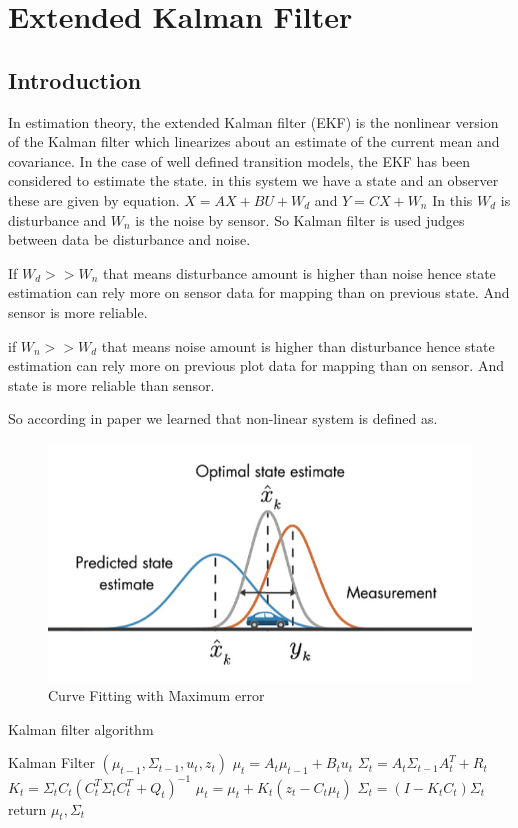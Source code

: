\section{Extended Kalman Filter}
\label{Spline_1}

\subsection{Introduction}
In estimation theory, the extended Kalman filter (EKF) is the nonlinear version of the Kalman filter which linearizes about an estimate of the current mean and covariance. In the case of well defined transition models, the EKF has been considered to estimate the state. 
in this system we have a state and an observer these are given by equation.
$ X=AX +BU + W_d $  and $ Y=CX + W_n $
In this $ W_d $ is disturbance and $ W_n $ is the noise by sensor.
So Kalman filter is used judges between data be disturbance and noise.


If $W_d >> W_n$ that means disturbance amount is higher than noise hence state estimation can rely more on sensor data for mapping than on previous state. And sensor is more reliable.

if $W_n >> W_d$ that means noise amount is higher than disturbance hence state estimation can rely more on previous plot data for mapping than on sensor. And state is more reliable than sensor.

So according in paper we learned that non-linear system is defined as.

\begin{figure}[!htb]
\includegraphics[width=\textwidth]{./figures/EKF.jpg}
\caption{Curve Fitting with Maximum error }
\end{figure}

\begin{algorithm}
\caption{Kalman filter algorithm}\label{alg-gd}
\begin{algorithmic}[1]
\STATE Kalman Filter \({(\mu_{t-1},\Sigma_{t-1},u_t,z_t)}\)
\STATE \( {\mu_{t}}=A_t \mu_{t-1} + B_t u_t \)
\STATE \( \Sigma_{t}=A_t \Sigma_{t-1} A_t^T +R_t\)
\STATE \( K_t = \Sigma_{t} C_t(C_t^T \Sigma_{t}C_t^T+Q_t)^{-1}\)
\STATE \( \mu_{t}=\mu_{t}+K_t(z_t-C_t \mu_t) \)
\STATE \(\Sigma_{t}=(I-K_t C_t)\Sigma_{t}\)
\STATE return \( \mu_t ,  \Sigma_t \)
\end{algorithmic}
\end{algorithm}

